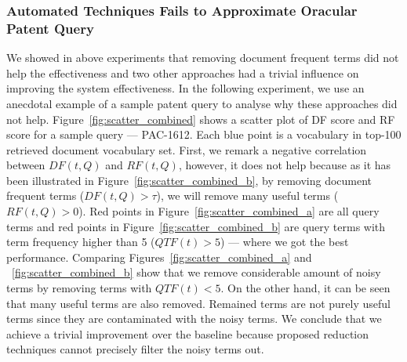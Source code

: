 \subsubsection{Automated Techniques Fails to Approximate Oracular Patent Query}
We showed in above experiments that removing document frequent terms did not help the effectiveness and 
two other approaches had a trivial influence on improving the system effectiveness. 
In the following experiment, we use an anecdotal example of a sample patent query to analyse why these approaches did not help. 
Figure~\ref{fig:scatter_combined} shows a scatter plot of DF score and RF score for a sample query --- PAC-1612. Each blue point is a vocabulary in top-100 retrieved document vocabulary set. First, we remark a negative correlation between $\mathit{DF(t, Q)}$ and $\mathit{RF(t, Q)}$, however, it does not help because as it has been illustrated in Figure~\ref{fig:scatter_combined_b}, by removing document frequent terms ($DF(t, Q)>\tau$), we will remove many useful terms ($RF(t, Q)>0$). Red points in Figure~\ref{fig:scatter_combined_a} are all query terms and red points in Figure~\ref{fig:scatter_combined_b} are query terms with term frequency higher than 5 ($QTF(t)>5$) --- where we got the best performance. 
Comparing Figures~\ref{fig:scatter_combined_a} and ~\ref{fig:scatter_combined_b} show that we remove considerable amount of noisy terms by removing terms with $QTF(t)<5$. 
On the other hand, it can be seen that many useful terms are also removed. Remained terms are not purely useful terms since they are contaminated with the noisy terms. We conclude that we achieve a trivial improvement over the baseline because proposed reduction techniques cannot precisely filter the noisy terms out. 
